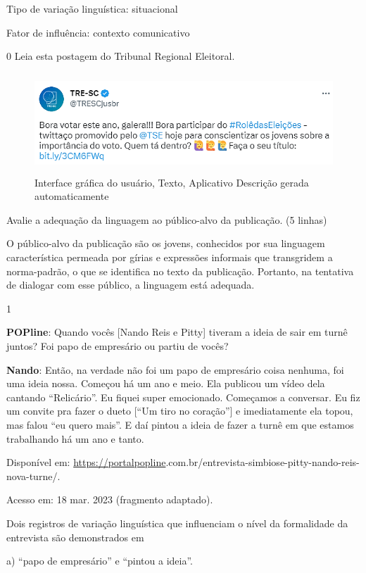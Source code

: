Tipo de variação linguística: situacional

Fator de influência: contexto comunicativo

\num{0} Leia esta postagem do Tribunal Regional Eleitoral.

\begin{figure}
\centering
\includegraphics[width=5.26042in,height=1.47161in]{./imgSAEB_8_POR/media/image27.png}
\caption{Interface gráfica do usuário, Texto, Aplicativo Descrição
gerada automaticamente}
\end{figure}

Avalie a adequação da linguagem ao público-alvo da publicação. (5
linhas)

O público-alvo da publicação são os jovens, conhecidos por sua linguagem
característica permeada por gírias e expressões informais que
transgridem a norma-padrão, o que se identifica no texto da publicação.
Portanto, na tentativa de dialogar com esse público, a linguagem está
adequada.


\num{1}

\textbf{POPline}: Quando vocês {[}Nando Reis e Pitty{]} tiveram a ideia
de sair em turnê juntos? Foi papo de empresário ou partiu de vocês?

\textbf{Nando}: Então, na verdade não foi um papo de empresário coisa
nenhuma, foi uma ideia nossa. Começou há um ano e meio. Ela publicou um
vídeo dela cantando ``Relicário''. Eu fiquei super emocionado. Começamos
a conversar. Eu fiz um convite pra fazer o dueto {[}``Um tiro no
coração''{]} e imediatamente ela topou, mas falou ``eu quero mais''. E
daí pintou a ideia de fazer a turnê em que estamos trabalhando há um ano
e tanto.

Disponível em:
\url{https://portalpopline}.com.br/entrevista-simbiose-pitty-nando-reis-nova-turne/.

Acesso em: 18 mar. 2023 (fragmento adaptado).

Dois registros de variação linguística que influenciam o nível da
formalidade da entrevista são demonstrados em

a) ``papo de empresário'' e ``pintou a ideia''.

